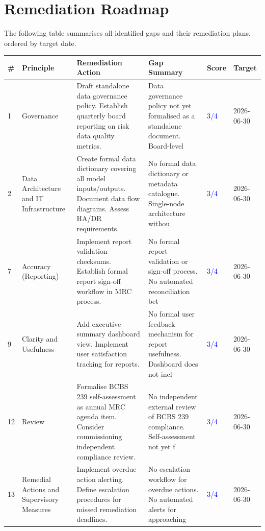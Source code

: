 \documentclass[11pt]{article}
\begin{document}
\clearpage

\section{Remediation Roadmap}

The following table summarises all identified gaps and their remediation plans,
ordered by target date.

\begin{longtable}{p{0.5cm}p{3cm}p{5.5cm}p{2.5cm}p{1.5cm}p{2cm}}
    \toprule
    \textbf{\#} & \textbf{Principle} & \textbf{Remediation Action} & \textbf{Gap Summary} & \textbf{Score} & \textbf{Target} \\
    \midrule
    \endhead
    1 & Governance & Draft standalone data governance policy. Establish quarterly board reporting on risk data quality metrics. & Data governance policy not yet formalised as a standalone document. Board-level  & \textcolor{blue}{3/4} & 2026-06-30 \\
    2 & Data Architecture and IT Infrastructure & Create formal data dictionary covering all model inputs/outputs. Document data flow diagrams. Assess HA/DR requirements. & No formal data dictionary or metadata catalogue. Single-node architecture withou & \textcolor{blue}{3/4} & 2026-06-30 \\
    7 & Accuracy (Reporting) & Implement report validation checksums. Establish formal report sign-off workflow in MRC process. & No formal report validation or sign-off process. No automated reconciliation bet & \textcolor{blue}{3/4} & 2026-06-30 \\
    9 & Clarity and Usefulness & Add executive summary dashboard view. Implement user satisfaction tracking for reports. & No formal user feedback mechanism for report usefulness. Dashboard does not incl & \textcolor{blue}{3/4} & 2026-06-30 \\
    12 & Review & Formalise BCBS 239 self-assessment as annual MRC agenda item. Consider commissioning independent compliance review. & No independent external review of BCBS 239 compliance. Self-assessment not yet f & \textcolor{blue}{3/4} & 2026-06-30 \\
    13 & Remedial Actions and Supervisory Measures & Implement overdue action alerting. Define escalation procedures for missed remediation deadlines. & No escalation workflow for overdue actions. No automated alerts for approaching  & \textcolor{blue}{3/4} & 2026-06-30 \\

\end{longtable}
\end{document}
